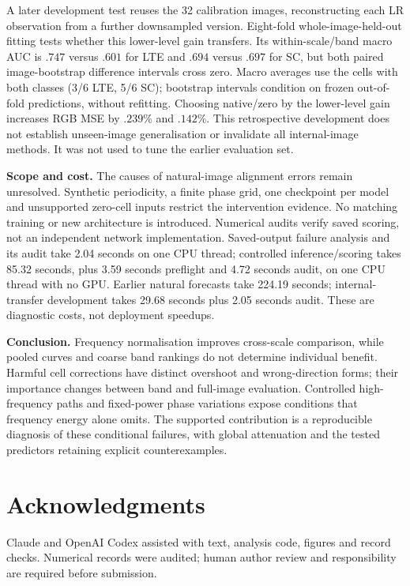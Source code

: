 A later development test reuses the 32 calibration images, reconstructing
each LR observation from a further downsampled version. Eight-fold
whole-image-held-out fitting tests whether this lower-level gain transfers.
Its within-scale/band macro AUC is $.747$ versus $.601$ for LTE and $.694$
versus $.697$ for SC, but both paired image-bootstrap difference intervals
cross zero. Macro averages use the cells with both classes (3/6 LTE,
5/6 SC); bootstrap intervals condition on frozen out-of-fold predictions,
without refitting. Choosing native/zero by the lower-level gain increases RGB
MSE by $.239\%$ and $.142\%$. This retrospective development does not
establish unseen-image generalisation or invalidate all internal-image
methods. It was not used to tune the earlier evaluation set.

\textbf{Scope and cost.}
The causes of natural-image alignment errors remain unresolved. Synthetic
periodicity, a finite phase grid, one checkpoint per model and unsupported
zero-cell inputs restrict the intervention evidence. No matching training
or new architecture is introduced. Numerical audits verify saved scoring,
not an independent network implementation. Saved-output failure analysis
and its audit take 2.04 seconds on one CPU thread; controlled inference/scoring takes
85.32 seconds, plus 3.59 seconds preflight and 4.72 seconds audit, on one
CPU thread with no GPU. Earlier natural forecasts take 224.19 seconds;
internal-transfer development takes 29.68 seconds plus 2.05 seconds audit.
These are diagnostic costs, not deployment speedups.

\textbf{Conclusion.}
Frequency normalisation improves cross-scale comparison, while pooled
curves and coarse band rankings do not determine individual benefit.
Harmful cell corrections have distinct overshoot and wrong-direction
forms; their importance changes between band and full-image evaluation.
Controlled high-frequency paths and fixed-power phase variations expose
conditions that frequency energy alone omits. The supported contribution
is a reproducible diagnosis of these conditional failures, with global
attenuation and the tested predictors retaining explicit counterexamples.

\section{Acknowledgments}
Claude and OpenAI Codex assisted with text, analysis code, figures and
record checks. Numerical records were audited; human author review and
responsibility are required before submission.
